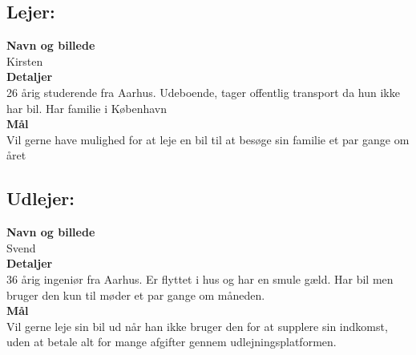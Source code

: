 \documentclass[Kravspecifikation/Kravspec_Main.tex]{subfiles}
\begin{document}
\subsection{Lejer:}
\textbf{Navn og billede}\\
Kirsten\\
\textbf{Detaljer}\\
26 årig studerende fra Aarhus. Udeboende, tager offentlig transport da hun ikke har bil. Har familie i København \\
\textbf{Mål}\\
Vil gerne have mulighed for at leje en bil til at besøge sin familie et par gange om året

\subsection{Udlejer:}
\textbf{Navn og billede}\\
Svend\\
\textbf{Detaljer}\\
36 årig ingeniør fra Aarhus. Er flyttet i hus og har en smule gæld. Har bil men bruger den kun til møder et par gange om måneden.\\
\textbf{Mål}\\
Vil gerne leje sin bil ud når han ikke bruger den for at supplere sin indkomst, uden at betale alt for mange afgifter gennem udlejningsplatformen. 
\end{document}
